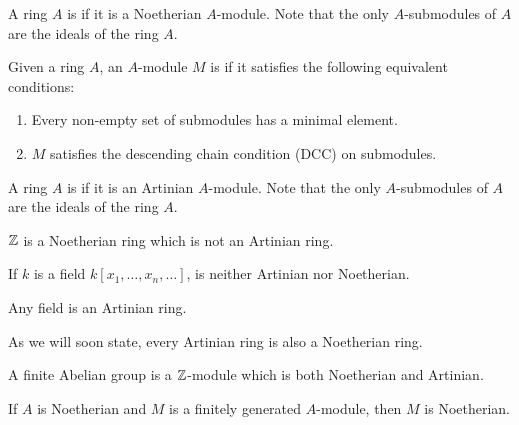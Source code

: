 \documentclass{ximera}
\begin{document}
\begin{definition} A ring $A$ is  if it is a Noetherian $A$-module. Note that the only $A$-submodules of $A$ are the ideals of the ring $A$.
\end{definition}

\begin{definition} Given a ring $A$, an $A$-module $M$ is  if it satisfies the following equivalent conditions:
\begin{enumerate}
\item Every non-empty set of submodules has a minimal element.
\item $M$ satisfies the descending chain condition (DCC) on submodules.
\end{enumerate}
\end{definition}

\begin{definition} A ring $A$ is  if it is an Artinian $A$-module. Note that the only $A$-submodules of $A$ are the ideals of the ring $A$.
\end{definition}

\begin{example} $\mathbb Z$ is a Noetherian ring which is not an Artinian ring.
\end{example}

\begin{example} If $k$ is a field $k[x_1,\dots,x_n,\dots]$,  is neither Artinian nor Noetherian. 
\end{example}

\begin{example} Any field is an Artinian ring. 
\end{example}

\begin{remark} As we will soon state, every Artinian ring is also a Noetherian ring. 
\end{remark}



\begin{example} A finite Abelian group is a $\mathbb Z$-module which is both Noetherian and Artinian.
\end{example}



\begin{proposition} If $A$ is Noetherian and $M$ is a finitely generated $A$-module, then $M$ is Noetherian.
\end{proposition}
\end{document}
